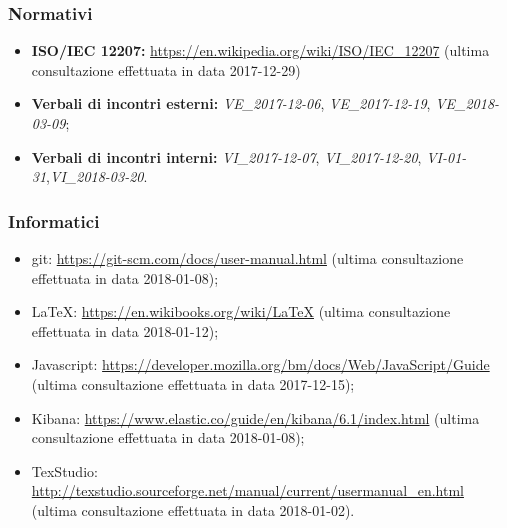 	\subsubsection{Normativi}
		\begin{itemize}
			\item \textbf{ISO/IEC 12207:} \href{https://en.wikipedia.org/wiki/ISO/IEC\_12207}{https://en.wikipedia.org/wiki/ISO/IEC\_12207} (ultima consultazione effettuata in data 2017-12-29)
			\item \textbf{Verbali di incontri esterni:} \emph{VE\_2017-12-06}, \emph{VE\_2017-12-19}, \emph{VE\_2018-03-09};
			\item \textbf{Verbali di incontri interni:}	\emph{VI\_2017-12-07}, \emph{VI\_2017-12-20}, \emph{VI-01-31},\newline \emph{VI\_2018-03-20}.
		\end{itemize}
	\subsubsection{Informatici}
	\begin{itemize}
		\item git:
		\href{https://git-scm.com/docs/user-manual.html}{https://git-scm.com/docs/user-manual.html} (ultima consultazione effettuata in data 2018-01-08);
		
		\item \LaTeX:  \href{https://en.wikibooks.org/wiki/LaTeX}{https://en.wikibooks.org/wiki/LaTeX} (ultima consultazione effettuata in data 2018-01-12);
		
		\item Javascript:
		\href{https://developer.mozilla.org/bm/docs/Web/JavaScript/Guide}{https://developer.mozilla.org/bm/docs/Web/JavaScript/Guide} (ultima consultazione effettuata in data 2017-12-15);
		
		\item Kibana: \href{https://www.elastic.co/guide/en/kibana/6.1/index.html}{https://www.elastic.co/guide/en/kibana/6.1/index.html} (ultima consultazione effettuata in data 2018-01-08);
		
		\item TexStudio: 
		\href{http://texstudio.sourceforge.net/manual/current/usermanual\_en.html}{http://texstudio.sourceforge.net/manual/current/usermanual\_en.html} (ultima consultazione effettuata in data 2018-01-02).
	\end{itemize}
	
